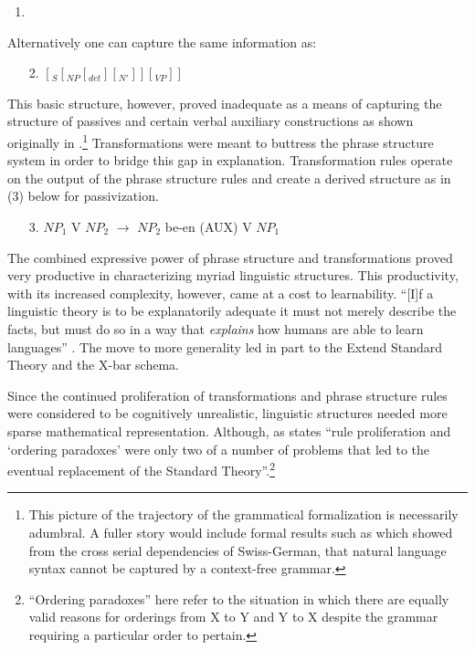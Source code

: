\documentclass[output=paper]{langscibook}
\begin{document}
\begin{enumerate}
\item 
{}
\end{enumerate}

Alternatively one can capture the same information as:
\begin{enumerate}
    \item[2.] $[_S[_{NP}[_{det}][_{N'}]][_{VP}]]$
\end{enumerate} 

This basic structure, however, proved inadequate as a means of capturing the structure of passives and certain verbal auxiliary constructions as shown originally in \cite{Postal1964}.\footnote{This picture of the trajectory of the grammatical formalization is necessarily adumbral. A fuller story would include formal results such as \cite{Shieber1985} which showed from the cross serial dependencies of Swiss-German, that natural language syntax cannot be captured by a context-free grammar.} Transformations were meant to buttress the phrase structure system in order to bridge this gap in explanation. Transformation rules operate on the output of the phrase structure rules and create a derived structure as in (3) below for passivization.

\begin{enumerate}
    \item[3.] $NP_1$ V $NP_2$ $\rightarrow$ $NP_2$ be-en (AUX) V $NP_1$
\end{enumerate} 

The combined expressive power of phrase structure and transformations proved very productive in characterizing myriad linguistic structures. This productivity, with its increased complexity, however, came at a cost to learnability. ``[I]f a linguistic theory is to be explanatorily adequate it must not merely describe the facts, but must do so in a way that \emph{explains} how humans are able to learn languages'' \citep[15]{Ludlow2011}. The move to more generality led in part to the Extend Standard Theory and the X-bar schema.   

Since the continued proliferation of transformations and phrase structure rules were considered to be cognitively unrealistic, linguistic structures needed more sparse mathematical representation. Although, as \cite[24]{Bickerton2014} states ``rule proliferation and `ordering paradoxes' were only two of a number of problems that led to the eventual replacement of the Standard Theory''.\footnote{``Ordering paradoxes'' here refer to the situation in which there are equally valid reasons for orderings from X to Y and Y to X despite the grammar requiring a particular order to pertain.}
\end{document}

